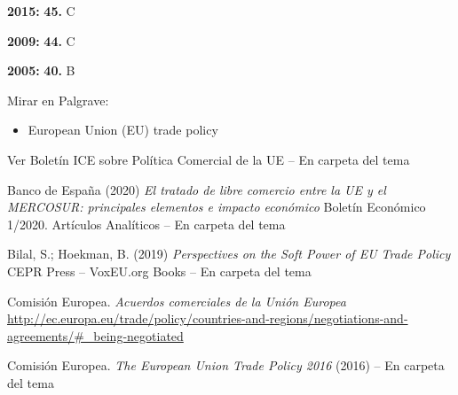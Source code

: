 \documentclass{nuevotema}
\begin{document}
\textbf{2015:} \textbf{45.} C

\textbf{2009:} \textbf{44.} C

\textbf{2005:} \textbf{40.} B

\bibliografia

Mirar en Palgrave:
\begin{itemize}
	\item European Union (EU) trade policy
\end{itemize}

Ver Boletín ICE sobre Política Comercial de la UE -- En carpeta del tema

Banco de España (2020) \textit{El tratado de libre comercio entre la UE y el MERCOSUR: principales elementos e impacto económico} Boletín Económico 1/2020. Artículos Analíticos -- En carpeta del tema

Bilal, S.; Hoekman, B. (2019) \textit{Perspectives on the Soft Power of EU Trade Policy} CEPR Press -- VoxEU.org Books -- En carpeta del tema

Comisión Europea. \textit{Acuerdos comerciales de la Unión Europea} \url{http://ec.europa.eu/trade/policy/countries-and-regions/negotiations-and-agreements/#\_being-negotiated}

Comisión Europea. \textit{The European Union Trade Policy 2016} (2016) -- En carpeta del tema
\end{document}
